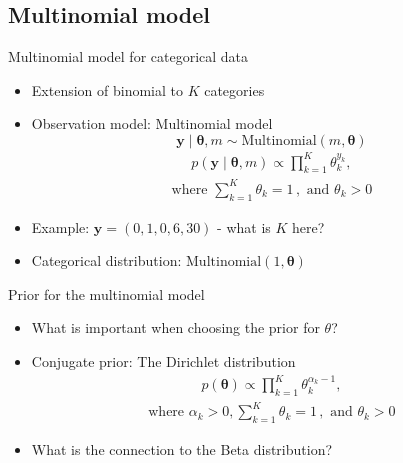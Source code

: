\documentclass[10pt]{beamer}
\begin{document}
\subsection{Multinomial model}

\begin{frame}{Multinomial model for categorical data}

  \begin{itemize}
  \item[-] Extension of binomial to $K$ categories
  \item[-] Observation model: {\color{uured}Multinomial model}
  \[
  \mathbf{y} \mid \boldsymbol{\theta}, m \sim \mathrm{Multinomial}(m,\boldsymbol{\theta})
  \]
  \pause
    \begin{align*}
      p(\mathbf{y} \mid \boldsymbol{\theta}, m) \propto \prod_{k=1}^K \theta_k^{y_k},
    \end{align*}
    \begin{align*}
      \text{where } \sum_{k=1}^K \theta_k = 1\,, \text{ and } \theta_k > 0
    \end{align*}
  \pause
  \item[-] Example: $\mathbf{y} = (0,1,0,6,30)$ - {\color{uured} what is $K$ here?}
  \pause
  \item[-] Categorical distribution: $\mathrm{Multinomial}(1,\boldsymbol{\theta})$
  \end{itemize}
\end{frame}


\begin{frame}{Prior for the multinomial model}

  \begin{itemize}
  \item[-] {\color{uured} What is important when choosing the prior for $\theta$?}
  \pause
  \item[-] Conjugate prior: The Dirichlet distribution
  \begin{align*}
    p(\boldsymbol{\theta}) \propto \prod_{k=1}^K \theta_k^{\alpha_k-1},
  \end{align*}
  \begin{align*}
      \text{where } \alpha_k > 0, \sum_{k=1}^K \theta_k = 1\,, \text{ and } \theta_k > 0
  \end{align*}
  \pause
  \item[-] {\color{uured} What is the connection to the Beta distribution?}
  \end{itemize}

\end{frame}
\end{document}

